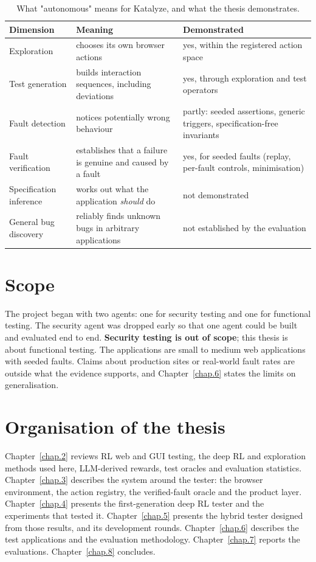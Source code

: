 \begin{table}[H]
\centering
\small
\caption{What "autonomous" means for Katalyze, and what the thesis demonstrates.}
\label{tab:autonomy}
\begin{tabularx}{\textwidth}{@{}l X X@{}}
\toprule
Dimension & Meaning & Demonstrated \\
\midrule
Exploration & chooses its own browser actions & yes, within the registered action space \\
Test generation & builds interaction sequences, including deviations & yes, through exploration and test operators \\
Fault detection & notices potentially wrong behaviour & partly: seeded assertions, generic triggers, specification-free invariants \\
Fault verification & establishes that a failure is genuine and caused by a fault & yes, for seeded faults (replay, per-fault controls, minimisation) \\
Specification inference & works out what the application \emph{should} do & not demonstrated \\
General bug discovery & reliably finds unknown bugs in arbitrary applications & not established by the evaluation \\
\bottomrule
\end{tabularx}
\end{table}

\section{Scope}
\label{sec:scope}

The project began with two agents: one for security testing and one for functional testing.
The security agent was dropped early so that one agent could be built and evaluated end to
end. \textbf{Security testing is out of scope}; this thesis is about functional testing.
The applications are small to medium web applications with seeded faults. Claims about
production sites or real-world fault rates are outside what the evidence supports, and
Chapter~\ref{chap.6} states the limits on generalisation.

\section{Organisation of the thesis}

Chapter~\ref{chap.2} reviews RL web and GUI testing, the deep RL and exploration methods
used here, LLM-derived rewards, test oracles and evaluation statistics.
Chapter~\ref{chap.3} describes the system around the tester: the browser environment, the
action registry, the verified-fault oracle and the product layer. Chapter~\ref{chap.4}
presents the first-generation deep RL tester and the experiments that tested it.
Chapter~\ref{chap.5} presents the hybrid tester designed from those results, and its
development rounds. Chapter~\ref{chap.6} describes the test applications and the evaluation
methodology. Chapter~\ref{chap.7} reports the evaluations. Chapter~\ref{chap.8} concludes.
